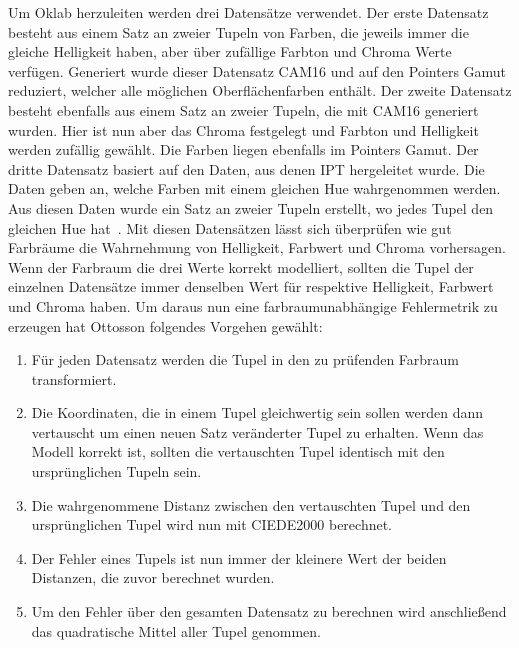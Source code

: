 \documentclass[12pt, a4paper, ngerman]{article}
\begin{document}
Um Oklab herzuleiten werden drei Datensätze verwendet. 
Der erste Datensatz besteht aus einem Satz an zweier Tupeln von Farben, die jeweils immer die gleiche Helligkeit haben, aber über zufällige Farbton und Chroma Werte verfügen.
Generiert wurde dieser Datensatz CAM16 und auf den Pointers Gamut reduziert, welcher alle möglichen Oberflächenfarben enthält.
Der zweite Datensatz besteht ebenfalls aus einem Satz an zweier Tupeln, die mit CAM16 generiert wurden. 
Hier ist nun aber das Chroma festgelegt und Farbton und Helligkeit werden zufällig gewählt. Die Farben liegen ebenfalls im Pointers Gamut.
Der dritte Datensatz basiert auf den Daten, aus denen IPT hergeleitet wurde. Die Daten geben an, welche Farben mit einem gleichen Hue wahrgenommen werden. 
Aus diesen Daten wurde ein Satz an zweier Tupeln erstellt, wo jedes Tupel den gleichen Hue hat~\cite{Oklab_2020}.
Mit diesen Datensätzen lässt sich überprüfen wie gut Farbräume die Wahrnehmung von Helligkeit, Farbwert und Chroma vorhersagen. 
Wenn der Farbraum die drei Werte korrekt modelliert, sollten die Tupel der einzelnen Datensätze immer denselben Wert für respektive Helligkeit, Farbwert und Chroma haben.
Um daraus nun eine farbraumunabhängige Fehlermetrik zu erzeugen hat Ottosson folgendes Vorgehen gewählt:
\begin{enumerate}
  \item Für jeden Datensatz werden die Tupel in den zu prüfenden Farbraum transformiert.
  \item Die Koordinaten, die in einem Tupel gleichwertig sein sollen werden dann vertauscht um einen neuen Satz veränderter Tupel zu erhalten. Wenn das Modell korrekt ist, sollten die vertauschten Tupel identisch mit den ursprünglichen Tupeln sein. 
  \item Die wahrgenommene Distanz zwischen den vertauschten Tupel und den ursprünglichen Tupel wird nun mit CIEDE2000 berechnet. 
  \item Der Fehler eines Tupels ist nun immer der kleinere Wert der beiden Distanzen, die zuvor berechnet wurden.
  \item Um den Fehler über den gesamten Datensatz zu berechnen wird anschließend das quadratische Mittel aller Tupel genommen.
\end{enumerate}
\end{document}
